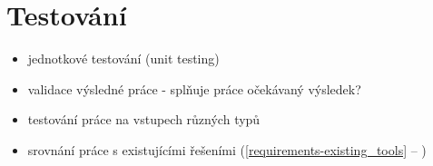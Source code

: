 \chapter{Testování}


\begin{itemize}
\item jednotkové testování (unit testing)
\item validace výsledné práce - splňuje práce očekávaný výsledek?
\item testování práce na vstupech různých typů
\item srovnání práce s existujícími řešeními (\ref{requirements-existing_tools} -- )
\end{itemize}

